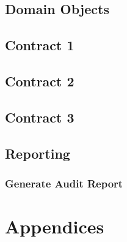 \documentclass[12pt]{article}
\begin{document}
                	\subsection{Domain Objects}
                	
                	\subsection{Contract 1}
                	
                	\subsection{Contract 2}
                	
                	\subsection{Contract 3}
                	
                  	\subsection{Reporting}
                  	
                  		\subsubsection{Generate Audit Report}
                
                
                
                \section{Appendices}
        
                
                        
        
        
\end{document}
